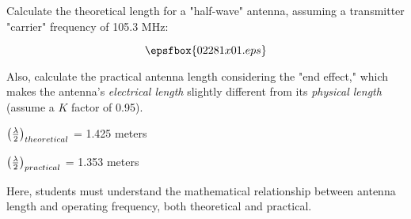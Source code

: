 

Calculate the theoretical length for a "half-wave" antenna, assuming a transmitter "carrier" frequency of 105.3 MHz:

$$\epsfbox{02281x01.eps}$$

Also, calculate the practical antenna length considering the "end effect," which makes the antenna's {\it electrical length} slightly different from its {\it physical length} (assume a $K$ factor of 0.95).







$\left({\lambda \over 2}\right)_{theoretical}$ = 1.425 meters 

\vskip 10pt

$\left({\lambda \over 2}\right)_{practical}$ = 1.353 meters







Here, students must understand the mathematical relationship between antenna length and operating frequency, both theoretical and practical.




